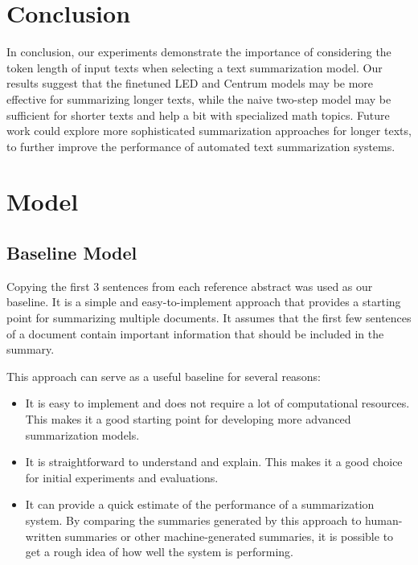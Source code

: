 \documentclass[12pt, twocolumn]{article}
\numberwithin{equation}{section}
\begin{document}
\section{Conclusion}
\label{sec:conclusion}

In conclusion, our experiments demonstrate the importance of considering the token length of input texts when selecting a text summarization model. Our results suggest that the finetuned LED and Centrum models may be more effective for summarizing longer texts, while the naive two-step model may be sufficient for shorter texts and help a bit with specialized math topics. Future work could explore more sophisticated summarization approaches for longer texts, to further improve the performance of automated text summarization systems.

\appendix

\section{Model}
\label{app:model}

\subsection{Baseline Model}
\label{app:model-baseline}

Copying the first 3 sentences from each reference abstract was used as our baseline. It is a simple and easy-to-implement approach that provides a starting point for summarizing multiple documents. It assumes that the first few sentences of a document contain important information that should be included in the summary.

This approach can serve as a useful baseline for several reasons:

\begin{itemize}
    \item It is easy to implement and does not require a lot of computational resources. This makes it a good starting point for developing more advanced summarization models.
    \item It is straightforward to understand and explain. This makes it a good choice for initial experiments and evaluations.
    \item It can provide a quick estimate of the performance of a summarization system. By comparing the summaries generated by this approach to human-written summaries or other machine-generated summaries, it is possible to get a rough idea of how well the system is performing.
\end{itemize}
\end{document}
